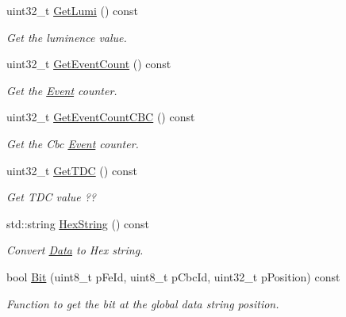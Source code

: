 \begin{CompactItemize}
uint32\_\-t \hyperlink{class_ph2___hw_interface_1_1_event_e5af75e033d2eb6d76a039e859a9ce86}{Get\-Lumi} () const 
\begin{CompactList}\small\item\em Get the luminence value. \item\end{CompactList}\item 
uint32\_\-t \hyperlink{class_ph2___hw_interface_1_1_event_aebf08f816e8a98f424ba8ab25e32231}{Get\-Event\-Count} () const 
\begin{CompactList}\small\item\em Get the \hyperlink{class_ph2___hw_interface_1_1_event}{Event} counter. \item\end{CompactList}\item 
uint32\_\-t \hyperlink{class_ph2___hw_interface_1_1_event_620592c831036eae724c37db45ca0765}{Get\-Event\-Count\-CBC} () const 
\begin{CompactList}\small\item\em Get the Cbc \hyperlink{class_ph2___hw_interface_1_1_event}{Event} counter. \item\end{CompactList}\item 
uint32\_\-t \hyperlink{class_ph2___hw_interface_1_1_event_2c193b4b2bdb35267f63d03cc684e7b1}{Get\-TDC} () const 
\begin{CompactList}\small\item\em Get TDC value ?? \item\end{CompactList}\item 
std::string \hyperlink{class_ph2___hw_interface_1_1_event_1dd8d9cc8a8169df80518d57b1075d2c}{Hex\-String} () const 
\begin{CompactList}\small\item\em Convert \hyperlink{class_ph2___hw_interface_1_1_data}{Data} to Hex string. \item\end{CompactList}\item 
bool \hyperlink{class_ph2___hw_interface_1_1_event_5b542b0d98a413feef14cc57cff250bf}{Bit} (uint8\_\-t p\-Fe\-Id, uint8\_\-t p\-Cbc\-Id, uint32\_\-t p\-Position) const 
\begin{CompactList}\small\item\em Function to get the bit at the global data string position. \item\end{CompactList}\item 

\end{CompactItemize}
